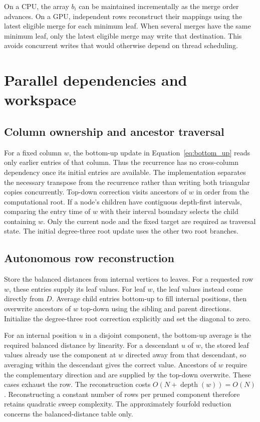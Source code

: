 On a CPU, the array $b_i$ can be maintained incrementally as the merge order advances.
On a GPU, independent rows reconstruct their mappings using the latest eligible merge for each minimum leaf.
When several merges have the same minimum leaf, only the latest eligible merge may write that destination.
This avoids concurrent writes that would otherwise depend on thread scheduling.

\section{Parallel dependencies and workspace}
\label{sec:parallel_details}

\subsection{Column ownership and ancestor traversal}

For a fixed column $w$, the bottom-up update in Equation~\eqref{eq:bottom_up} reads only earlier entries of that column.
Thus the recurrence has no cross-column dependency once its initial entries are available.
The implementation separates the necessary transpose from the recurrence rather than writing both triangular copies concurrently.
Top-down correction visits ancestors of $w$ in order from the computational root.
If a node's children have contiguous depth-first intervals, comparing the entry time of $w$ with their interval boundary selects the child containing $w$.
Only the current node and the fixed target are required as traversal state.
The initial degree-three root update uses the other two root branches.

\subsection{Autonomous row reconstruction}

Store the balanced distances from internal vertices to leaves.
For a requested row $w$, these entries supply its leaf values.
For leaf $w$, the leaf values instead come directly from $D$.
Average child entries bottom-up to fill internal positions, then overwrite ancestors of $w$ top-down using the sibling and parent directions.
Initialize the degree-three root correction explicitly and set the diagonal to zero.

For an internal position $u$ in a disjoint component, the bottom-up average is the required balanced distance by linearity.
For a descendant $u$ of $w$, the stored leaf values already use the component at $w$ directed away from that descendant, so averaging within the descendant gives the correct value.
Ancestors of $w$ require the complementary direction and are supplied by the top-down overwrite.
These cases exhaust the row.
The reconstruction costs $O(N+\operatorname{depth}(w))=O(N)$.
Reconstructing a constant number of rows per pruned component therefore retains quadratic sweep complexity.
The approximately fourfold reduction concerns the balanced-distance table only.

